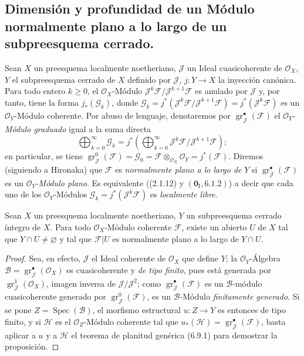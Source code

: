 \subsection{Dimensión y profundidad de un Módulo normalmente plano a lo largo de un
subpreesquema cerrado.}
\label{subsection:IV.6.10}

\begin{env}[6.10.1]
Sean $X$ un preesquema localmente noetheriano, $\mathcal J$ un Ideal
cuasicoherente de $\mathcal O_X$, $Y$ el subpreesquema cerrado de $X$ definido
por $\mathcal J$, $j:Y\to X$ la inyección canónica. Para todo entero $k\geq0$,
el $\mathcal O_X$-Módulo
$\mathcal J^k\mathcal F/\mathcal J^{k+1}\mathcal F$ es anulado por
$\mathcal J$ y, por tanto, tiene la forma $j_*(\mathcal G_k)$, donde
$\mathcal G_k=j^*(\mathcal J^k\mathcal F/\mathcal J^{k+1}\mathcal F)=j^*(\mathcal J^k\mathcal F)$
es un $\mathcal O_Y$-Módulo coherente. Por abuso de lenguaje, denotaremos por
$\operatorname{gr}_{\mathcal J}^{\bullet}(\mathcal F)$ el
$\mathcal O_Y$-\emph{Módulo graduado} igual a la suma directa
\[
\bigoplus_{k=0}^{\infty}\mathcal G_k
=j^*\left(\bigoplus_{k=0}^{\infty}
\mathcal J^k\mathcal F/\mathcal J^{k+1}\mathcal F\right);
\]
en particular, se tiene
$\operatorname{gr}_{\mathcal J}^{0}(\mathcal F)=\mathcal G_0
=\mathcal F\otimes_{\mathcal O_X}\mathcal O_Y=j^*(\mathcal F)$. Diremos
(siguiendo a Hironaka) que $\mathcal F$ es \emph{normalmente plano a lo largo de} $Y$ si
$\operatorname{gr}_{\mathcal J}^{\bullet}(\mathcal F)$ es un
$\mathcal O_Y$-\emph{Módulo plano}. Es equivalente ((2.1.12) y
$(\mathbf{0}_{\mathrm I},6.1.2)$) a decir que cada uno de los $\mathcal O_Y$-Módulos
$\mathcal G_k=j^*(\mathcal J^k\mathcal F)$ es \emph{localmente libre}.
\end{env}

\begin{proposition}[6.10.2]
\label{IV.2.s6.10.2-fr}
Sean $X$ un preesquema localmente noetheriano, $Y$ un subpreesquema cerrado
\textup{íntegro} de $X$. Para todo $\mathcal O_X$-Módulo coherente $\mathcal F$,
existe un abierto $U$ de $X$ tal que $Y\cap U\ne\varnothing$ y tal que
$\mathcal F|U$ es normalmente plano a lo largo de $Y\cap U$.
\end{proposition}

\begin{proof}
Sea, en efecto, $\mathcal J$ el Ideal coherente de $\mathcal O_X$ que define
$Y$; la $\mathcal O_Y$-Álgebra
$\mathcal B=\operatorname{gr}_{\mathcal J}^{\bullet}(\mathcal O_X)$ es
cuasicoherente y \emph{de tipo finito}, pues está generada por
$\operatorname{gr}_{\mathcal J}^{1}(\mathcal O_X)$, imagen inversa de
$\mathcal J/\mathcal J^2$; como
$\operatorname{gr}_{\mathcal J}^{\bullet}(\mathcal F)$ es un
$\mathcal B$-módulo cuasicoherente generado por
$\operatorname{gr}_{\mathcal J}^{0}(\mathcal F)$, es un
$\mathcal B$-Módulo \emph{finitamente generado}. Si se pone
$Z=\operatorname{Spec}(\mathcal B)$, el morfismo estructural $u:Z\to Y$ es
entonces de tipo finito, y si $\mathcal H$ es el $\mathcal O_Z$-Módulo coherente
tal que $u_*(\mathcal H)=\operatorname{gr}_{\mathcal J}^{\bullet}(\mathcal F)$,
basta aplicar a $u$ y a $\mathcal H$ el teorema de planitud
genérica (6.9.1) para demostrar la proposición.
\end{proof}
